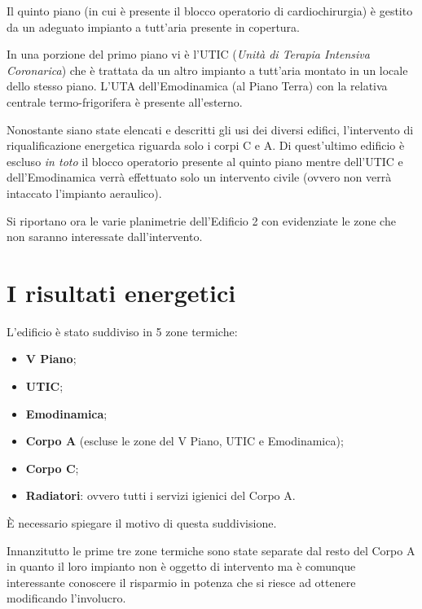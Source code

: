 	

Il quinto piano (in cui è presente il blocco operatorio di cardiochirurgia) è gestito da un adeguato impianto a tutt'aria presente in copertura.

In una porzione del primo piano vi è l'UTIC (\emph{Unità di Terapia Intensiva Coronarica}) che è trattata da un altro impianto a tutt'aria montato in un locale dello stesso piano. L'UTA dell'Emodinamica (al Piano Terra) con la relativa centrale termo-frigorifera è presente all'esterno.

Nonostante siano state elencati e descritti gli usi dei diversi edifici, l'intervento di riqualificazione energetica riguarda solo i corpi C e A. Di quest'ultimo edificio è escluso \emph{in toto} il blocco operatorio presente al quinto piano mentre dell'UTIC e dell'Emodinamica verrà effettuato solo un intervento civile (ovvero non verrà intaccato l'impianto aeraulico).

Si riportano ora le varie planimetrie dell'Edificio 2 con evidenziate le zone che non saranno interessate dall'intervento.

\label{PT}
\label{P1}
\label{P2}
\label{P3}
\label{P4}

\section{I risultati energetici}
L'edificio è stato suddiviso in 5 zone termiche:
\begin{itemize}
	\item \textbf{V Piano};
	\item \textbf{UTIC};
	\item \textbf{Emodinamica};
	\item \textbf{Corpo A} (escluse le zone del V Piano, UTIC e Emodinamica);
	\item \textbf{Corpo C};
	\item \textbf{Radiatori}: ovvero tutti i servizi igienici del Corpo A. 
\end{itemize}
È necessario spiegare il motivo di questa suddivisione.

Innanzitutto le prime tre zone termiche sono state separate dal resto del Corpo A in quanto il loro impianto non è oggetto di intervento ma è comunque interessante conoscere il risparmio in potenza che si riesce ad ottenere modificando l'involucro.

